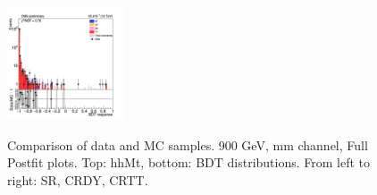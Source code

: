 \begin{figure}[tbp]
\begin{center}
    \includegraphics[width=0.31\textwidth]{figures/mm_900_july20/bdt_response_mm_CRTT_FullPostfit_plot_july20.png}\\
    \caption{Comparison of data and MC samples. 900 GeV, mm channel, Full Postfit plots. Top: hhMt, bottom: BDT distributions. From left to right: SR, CRDY, CRTT.}
    \label{fig:MCcomparison_mm_900}
  \end{center}
\end{figure}


